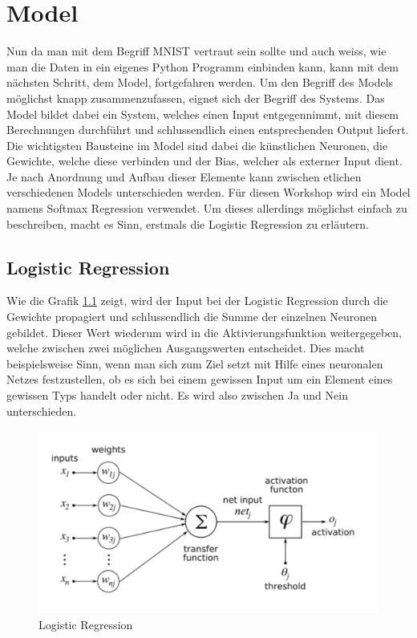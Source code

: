 \chapter{Model}



Nun da man mit dem Begriff MNIST vertraut sein sollte und auch weiss, wie man die Daten in ein eigenes Python Programm einbinden kann, kann mit dem nächsten Schritt, dem Model, fortgefahren werden. 
Um den Begriff des Models möglichst knapp zusammenzufassen, eignet sich der Begriff des Systems. Das Model bildet dabei ein System, welches einen Input entgegennimmt, mit diesem Berechnungen durchführt und schlussendlich einen entsprechenden Output liefert. Die wichtigsten Bausteine im Model sind dabei die künstlichen Neuronen, die Gewichte, welche diese verbinden und der Bias, welcher als externer Input dient. Je nach Anordnung und Aufbau dieser Elemente kann zwischen etlichen verschiedenen Models unterschieden werden. Für diesen Workshop wird ein Model namens Softmax Regression verwendet. Um dieses allerdings möglichst einfach zu beschreiben, macht es Sinn, erstmals die Logistic Regression zu erläutern.


\section{Logistic Regression}
Wie die Grafik \ref{fig:logistic_regression} zeigt, wird der Input bei der Logistic Regression durch die Gewichte propagiert und schlussendlich die Summe der einzelnen Neuronen gebildet. Dieser Wert wiederum wird in die Aktivierungsfunktion weitergegeben, welche zwischen zwei möglichen Ausgangswerten entscheidet. Dies macht beispielsweise Sinn, wenn man sich zum Ziel setzt mit Hilfe eines neuronalen Netzes festzustellen, ob es sich bei einem gewissen Input um ein Element eines gewissen Typs handelt oder nicht. Es wird also zwischen Ja und Nein unterschieden.
\begin{figure}[!ht]
\centering
\includegraphics[width=1.00\textwidth]{images/logistic}
\caption{Logistic Regression}
\label{fig:logistic_regression}
\end{figure}


